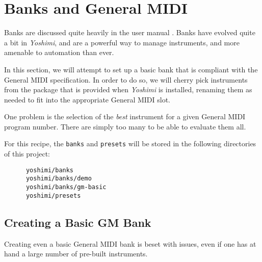%
%
%

\section{Banks and General MIDI}
\label{sec:cookbook_banks}

   Banks are discussed quite heavily in the user manual \cite{yoshimidoc}.
   Banks have evolved quite a bit in \textsl{Yoshimi}, and are
   a powerful way to manage instruments, and more amenable to automation
   than ever.

   In this section, we will attempt to set up a basic bank that is
   compliant with the General MIDI specification.  In order to do so, we
   will cherry pick instruments from the package that is provided when
   \textsl{Yoshimi} is installed, renaming them as needed to fit into the
   appropriate General MIDI slot.

   One problem is the selection of the \textsl{best} instrument for a given
   General MIDI program number.  There are simply too many to be able to
   evaluate them all.

   For this recipe, the \texttt{banks} and \texttt{presets} will
   be stored in the following directories of this project:

   \begin{verbatim}
      yoshimi/banks
      yoshimi/banks/demo
      yoshimi/banks/gm-basic
      yoshimi/presets
   \end{verbatim}

\subsection{Creating a Basic GM Bank}
\label{subsec:cookbook_banks_basic_gm}

   Creating even a basic General MIDI bank is beset with issues, even if one
   has at hand a large number of pre-built instruments.


